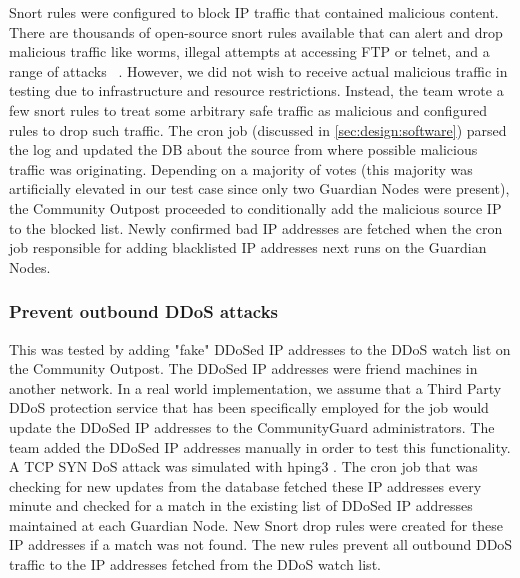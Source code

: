  Snort rules were configured to block IP traffic that contained malicious content. There are thousands of open-source snort rules available that can alert and drop malicious traffic like worms, illegal attempts at accessing FTP or telnet, and a range of attacks ~\cite{Roesch:1999:SLI:1039834.1039864}. However, we did not wish to receive actual malicious traffic in testing due to infrastructure and resource restrictions. Instead, the team wrote a few snort rules to treat some arbitrary safe traffic as malicious and configured rules to drop such traffic. 
The cron job (discussed in \ref{sec:design:software}) parsed the log and updated the DB about the source from where possible malicious traffic was originating. Depending on a majority of votes (this majority was artificially elevated in our test case since only two Guardian Nodes were present), the Community Outpost proceeded to conditionally add the malicious source IP to the blocked list. Newly confirmed bad IP addresses are fetched when the cron job responsible for adding blacklisted IP addresses next runs on the Guardian Nodes. %

\subsubsection{Prevent outbound DDoS attacks}
\label{sec:eval:outddos}

This was tested by adding "fake" DDoSed IP addresses to the DDoS watch list on the Community Outpost. The DDoSed IP addresses were friend machines in another network. In a real world implementation, we assume that a Third Party DDoS protection service \cite{DDoSPreventionTools} that has been specifically employed for the job would update the DDoSed IP addresses to the CommunityGuard administrators. The team added the DDoSed IP addresses manually in order to test this functionality. A TCP SYN DoS attack was simulated with hping3 \cite{hpingReferralPaper} \cite{hping}.  The cron job that was checking for new updates from the database fetched these IP addresses every minute and checked for a match in the existing list of DDoSed IP addresses maintained at each Guardian Node. New Snort drop rules were created for these IP addresses if a match was not found. The new rules prevent all outbound DDoS traffic to the IP addresses fetched from the DDoS watch list. 

